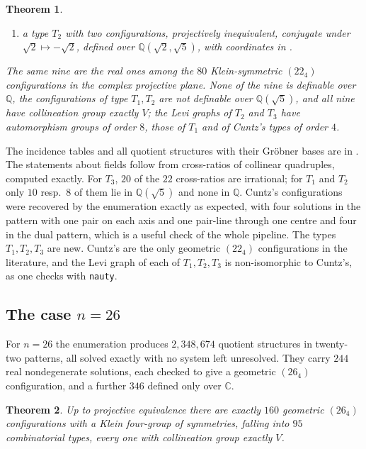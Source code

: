 \documentclass[11pt]{article}
\theoremstyle{plain}
\newtheorem{theorem}{Theorem}
\theoremstyle{definition}
\newcommand{\CC}{\mathbb{C}}
\newcommand{\QQ}{\mathbb{Q}}
\begin{document}
\begin{theorem}
\begin{enumerate}
\item[(iv)] a type $T_2$ with two configurations, projectively inequivalent, conjugate under $\sqrt2\mapsto-\sqrt2$, defined over $\QQ(\sqrt2,\sqrt5)$, with coordinates in \cite{Lu26}.
\end{enumerate}
The same nine are the real ones among the $80$ Klein-symmetric $(22_4)$ configurations in the complex projective plane.  None of the nine is definable over $\QQ$, the configurations of type $T_1,T_2$ are not definable over $\QQ(\sqrt5)$, and all nine have collineation group exactly $V$; the Levi graphs of $T_2$ and $T_3$ have automorphism groups of order $8$, those of $T_1$ and of Cuntz's types of order $4$.
\end{theorem}

The incidence tables and all quotient structures with their Gr\"obner bases are in \cite{Lu26}.  The statements about fields follow from cross-ratios of collinear quadruples, computed exactly.  For $T_3$, $20$ of the $22$ cross-ratios are irrational; for $T_1$ and $T_2$ only $10$ resp.\ $8$ of them lie in $\QQ(\sqrt5)$ and none in $\QQ$.  Cuntz's configurations were recovered by the enumeration exactly as expected, with four solutions in the pattern with one pair on each axis and one pair-line through one centre and four in the dual pattern, which is a useful check of the whole pipeline.  The types $T_1,T_2,T_3$ are new.  Cuntz's are the only geometric $(22_4)$ configurations in the literature, and the Levi graph of each of $T_1,T_2,T_3$ is non-isomorphic to Cuntz's, as one checks with \texttt{nauty}.


\subsection{The case $n=26$}\label{sec:26}

For $n=26$ the enumeration produces $2{,}348{,}674$ quotient structures in twenty-two patterns, all solved exactly with no system left unresolved.  They carry $244$ real nondegenerate solutions, each checked to give a geometric $(26_4)$ configuration, and a further $346$ defined only over $\CC$.

\begin{theorem}\label{thm:26}
Up to projective equivalence there are exactly $160$ geometric $(26_4)$ configurations with a Klein four-group of symmetries, falling into $95$ combinatorial types, every one with collineation group exactly $V$.
\end{theorem}
\end{document}

